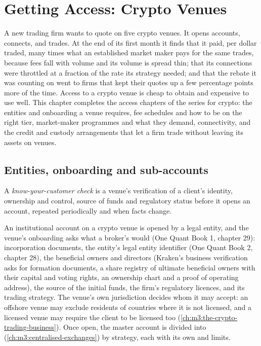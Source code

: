 \chapter{Getting Access: Crypto Venues}\label{ch:m3:getting-access-crypto-venues}

A new trading firm wants to quote on five crypto venues. It opens accounts, connects, and trades. At the
end of its first month it finds that it paid, per dollar traded, many times what an established market
maker pays for the same trades, because fees fall with volume and its volume is spread thin; that its
connections were throttled at a fraction of the rate its strategy needed; and that the rebate it was
counting on went to firms that kept their quotes up a few percentage points more of the time. Access to a
crypto venue is cheap to obtain and expensive to use well. This chapter completes the access chapters of
the series for crypto: the entities and onboarding a venue requires, fee schedules and how to be on the
right tier, market-maker programmes and what they demand, connectivity, and the credit and custody
arrangements that let a firm trade without leaving its assets on venues.

\section{Entities, onboarding and sub-accounts}

\begin{definition}\label{def:m3:getting-access-crypto-venues:kyc}
A \emph{know-your-customer check} is a venue's verification of a client's identity, ownership
and control, source of funds and regulatory status before it opens an account, repeated periodically and when facts change.
\end{definition}

An institutional account on a crypto venue is opened by a legal entity, and the venue's onboarding asks what a broker's would
(One Quant Book 1, chapter 29): incorporation documents, the entity's legal entity identifier (One Quant Book 2, chapter 28), the beneficial
owners and directors (Kraken's business verification asks for formation documents, a share registry of ultimate beneficial owners with their
capital and voting rights, an ownership chart and a proof of operating address), the source of the initial funds, the firm's regulatory licences, and its trading strategy. The venue's own
jurisdiction decides whom it may accept: an offshore venue may exclude residents of countries where it is not licensed, and a
licensed venue may require the client to be licensed too (\cref{ch:m3:the-crypto-trading-business}). Once open, the master account
is divided into  (\cref{ch:m3:centralised-exchanges}) by strategy, each with its own  and limits.


